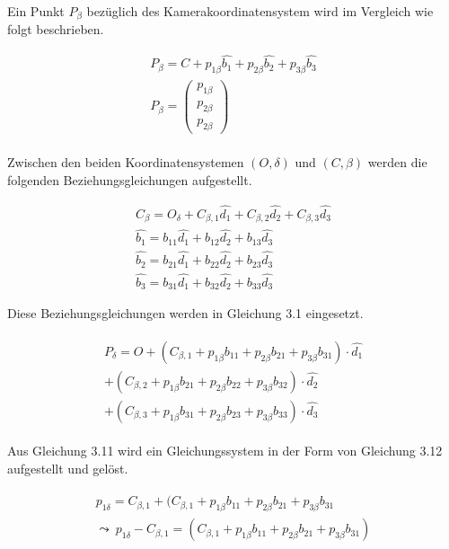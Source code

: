 Ein Punkt $P_\beta$ bezüglich des Kamerakoordinatensystem wird im Vergleich wie folgt beschrieben.
	
	\begin{gather}
	P_\beta = C + p_{1\beta}\hat{b_1} + p_{2\beta}\hat{b_2} +  p_{3\beta}\hat{b_3}\\
	P_\beta = \begin{pmatrix} p_{1\beta} \\  p_{2\beta} \\ p_{2\beta}\end{pmatrix}
	\end{gather}\\
	
	Zwischen den beiden Koordinatensystemen	$(O,\delta)$  und $(C,\beta)$ werden die folgenden Beziehungsgleichungen aufgestellt. 
	
	\begin{gather}
	C_\beta = O_\delta + C_{\beta,1}\hat{d_1} +C_{\beta,2}\hat{d_2} + C_{\beta,3}\hat{d_3}\\
	\hat{b_1} = b_{11}\hat{d_1} +  b_{12}\hat{d_2} +  b_{13}\hat{d_3}\\
	\hat{b_2} = b_{21}\hat{d_1} +  b_{22}\hat{d_2} +  b_{23}\hat{d_3}\\
	\hat{b_3} = b_{31}\hat{d_1} +  b_{32}\hat{d_2} +  b_{33}\hat{d_3}
	\end{gather}
	
	Diese Beziehungsgleichungen werden in Gleichung 3.1 eingesetzt.
	
	\begin{gather}
	\begin{split}
	P_\delta = O + (C_{\beta,1} + p_{1\beta}b_{11} +  p_{2\beta}b_{21} + p_{3\beta}b_{31}) \cdot \hat{d_1}\\
	+(C_{\beta,2} + p_{1\beta}b_{21} +  p_{2\beta}b_{22} + p_{3\beta}b_{32} )\cdot \hat{d_2}\\
	+ (C_{\beta,3} + p_{1\beta}b_{31} +  p_{2\beta}b_{23} + p_{3\beta}b_{33} )\cdot \hat{d_3}
	\end{split}
	\end{gather}
	
Aus Gleichung 3.11 wird ein Gleichungssystem in der Form von Gleichung 3.12 aufgestellt und gelöst.
	
	\begin{gather}
	\begin{split}
	p_{1\delta} = C_{\beta,1} + (C_{\beta,1} + p_{1\beta}b_{11} +  p_{2\beta}b_{21} + p_{3\beta}b_{31} \\
	\leadsto \: p_{1\delta} - C_{\beta,1} =  (C_{\beta,1} + p_{1\beta}b_{11} +  p_{2\beta}b_{21} + p_{3\beta}b_{31})
	\end{split}
	\end{gather}
	
